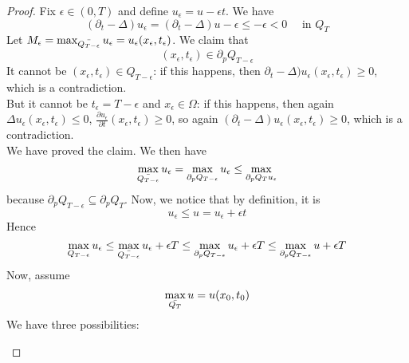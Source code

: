 \begin{ProofBox}
    \begin{proof}
        Fix $\epsilon \in (0,T)$ and define $u_\epsilon=u-\epsilon t$. We have
        \begin{equation*}
            (\partial_t - \Delta) u_\epsilon =(\partial_t - \Delta) u - \epsilon \leq -\epsilon < 0 \quad\text{ in } Q_T
        \end{equation*}
        Let $M_\epsilon = \max_{\Bar{Q_{T-\epsilon}}} u_\epsilon = u_\epsilon (x_\epsilon, t_\epsilon)$. We claim that 
        \begin{equation*}
            (x_\epsilon, t_\epsilon) \in \partial_p Q_{T-\epsilon}
        \end{equation*}
        It cannot be $(x_\epsilon, t_\epsilon) \in Q_{T-\epsilon}$: if this happens, then $\partial_t - \Delta) u_\epsilon(x_\epsilon, t_\epsilon) \geq 0$, which is a contradiction. \\
        But it cannot be $t_\epsilon = T-\epsilon$ and $x_\epsilon \in \Omega$: if this happens, then again $\Delta u_\epsilon (x_\epsilon, t_\epsilon) \leq 0$, $\frac{\partial u_\epsilon}{\partial t}(x_\epsilon, t_\epsilon) \geq 0$, so again $(\partial_t - \Delta)u_\epsilon(x_\epsilon, t_\epsilon) \geq 0$, which is a contradiction. \\
        We have proved the claim. We then have
        \begin{equation*}
            \max_{\Bar{Q_{T-\epsilon}}} u_\epsilon = \max_{\partial_pQ_{T-\epsilon}} u_\epsilon  \leq \max_{\partial_pQ_T u_\epsilon}
        \end{equation*}
        because $\partial_p Q_{T-\epsilon} \subseteq \partial_p Q_T$. Now, we notice that by definition, it is
        \begin{equation*}
            u_\epsilon \leq u = u_\epsilon + \epsilon t
        \end{equation*}
        Hence
        \begin{equation*}
            \max_{Q_{T-\epsilon}} u_\epsilon \leq \max_{\Bar{Q_{T-\epsilon}}} u_\epsilon + \epsilon T \leq \max_{\partial_pQ_{T-\epsilon}} u_\epsilon + \epsilon T \leq \max_{\partial_pQ_{T-\epsilon}} u + \epsilon T
        \end{equation*}
        Now, assume 
        \begin{equation*}
            \max_{\Bar{Q_T}}u = u(x_0,t_0)
        \end{equation*}
        We have three possibilities:
        \begin{enumerate}

\end{enumerate}
\end{proof}
\end{ProofBox}
